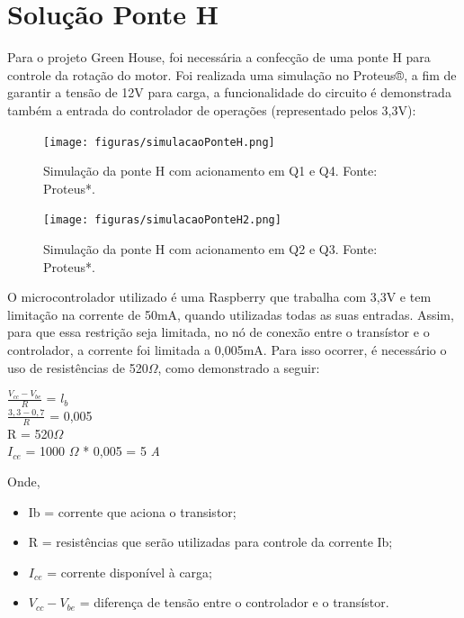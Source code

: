
\section{Solução Ponte H}

Para o projeto Green House, foi necessária a confecção de uma ponte H para controle da rotação do motor. Foi realizada uma simulação no Proteus®, a fim de garantir a tensão de 12V para carga, a funcionalidade do circuito é demonstrada também a entrada do controlador de operações (representado pelos 3,3V):

\begin{figure}[H]
	\centering
	\texttt{[image: figuras/simulacaoPonteH.png]}
	\caption{Simulação da ponte H com acionamento em Q1 e Q4. Fonte: Proteus*.}
	\label{simulação ponte H}
\end{figure}

\begin{figure}[H]
	\centering
	\texttt{[image: figuras/simulacaoPonteH2.png]}
	\caption{Simulação da ponte H com acionamento em Q2 e Q3. Fonte: Proteus*.}
	\label{simulação ponte H 2}
\end{figure}

O microcontrolador utilizado é uma Raspberry que trabalha com 3,3V e tem limitação na corrente de 50mA, quando utilizadas todas as suas entradas. Assim, para que essa restrição seja limitada, no nó de conexão entre o transístor e o controlador, a corrente foi limitada a 0,005mA. Para isso ocorrer, é necessário o uso de resistências de 520$\Omega$, como demonstrado a seguir:

\begin{center}
	
	$\frac{V_{cc} - V_{be}}{R}$ = $l_{b}$ \\
	$\frac{3,3 - 0,7}{R}$ = 0,005\\
	R = 520$\Omega$\\
	$I_{ce}$ = 1000 $\Omega$ * 0,005 = 5 \textit{A}
	
\end{center}

Onde,

\begin{itemize}
	
\item Ib = corrente que aciona o transistor;

\item R = resistências que serão utilizadas para controle da corrente Ib;

\item $I_{ce}$ = corrente disponível à carga;

\item ${V_{cc} - V_{be}}$ = diferença de tensão entre o controlador e o transístor.

\end{itemize}

